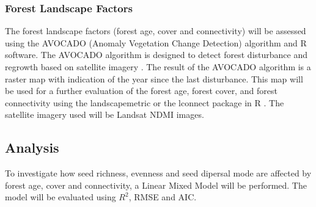 
\subsubsection{Forest Landscape Factors}
The forest landscape factors (forest age, cover and connectivity) will be assessed using the AVOCADO (Anomaly Vegetation Change Detection) algorithm and R software. The AVOCADO algorithm is designed to detect forest disturbance and regrowth based on satellite imagery \citep{decuyperContinuousMonitoringForest2022}. The result of the AVOCADO algorithm is a raster map with indication of the year since the last disturbance. This map will be used for a further evaluation of the forest age, forest cover, and forest connectivity using the landscapemetric or the lconnect package in R \citep{mestreLconnectPackageVersatile2023, hesselbarthLandscapemetricsOpensourceTool2019}. The satellite imagery used will be Landsat NDMI images. 

\subsection{Analysis}
To investigate how seed richness, evenness and seed dipersal mode are affected by forest age, cover and connectivity, a Linear Mixed Model will be performed. The model will be evaluated using $R^2$, RMSE and AIC.

 